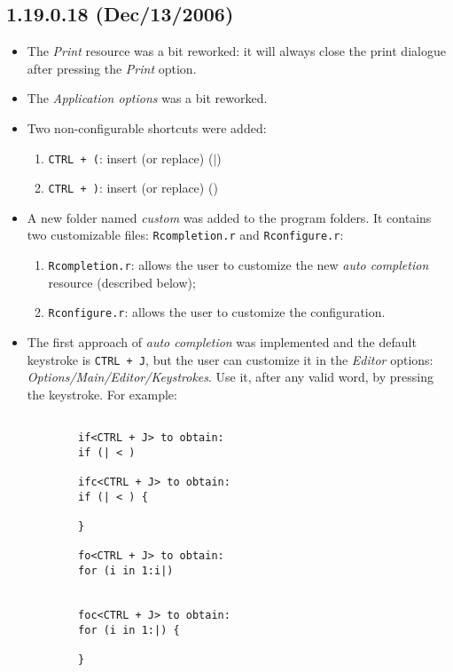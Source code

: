 \subsection*{1.19.0.18 (Dec/13/2006)}
\begin{itemize}
  \item The \textit{Print} resource was a bit reworked: it will always close
    the print dialogue after pressing the \textit{Print} option.
  \item The \textit{Application options} was a bit reworked.
  \item Two non-configurable shortcuts were added:
    \begin{enumerate}
      \item \texttt{CTRL + (}: insert (or replace) ($|$)
      \item \texttt{CTRL + )}: insert (or replace) ()
    \end{enumerate}
  \item A new folder named \textit{custom} was added to the program folders.
    It contains two customizable files: \texttt{Rcompletion.r} and
    \texttt{Rconfigure.r}:
    \begin{enumerate}
      \item \texttt{Rcompletion.r}: allows the user to customize the new
        \textit{auto completion} resource (described below);
      \item \texttt{Rconfigure.r}: allows the user to customize the \RR{}
        configuration.
    \end{enumerate}
  \item The first approach of \textit{auto completion} was implemented and
    the default keystroke is \texttt{CTRL + J}, but the user can customize it
    in the \textit{Editor} options: \textit{Options/Main/Editor/Keystrokes}.
    Use it, after any valid word, by pressing the keystroke. For example:

    \begin{footnotesize}
      \begin{verbatim}

        if<CTRL + J> to obtain:
        if (| < )

        ifc<CTRL + J> to obtain:
        if (| < ) {

        }

        fo<CTRL + J> to obtain:
        for (i in 1:i|)


        foc<CTRL + J> to obtain:
        for (i in 1:|) {

        }


\end{verbatim}
\end{footnotesize}
\end{itemize}
